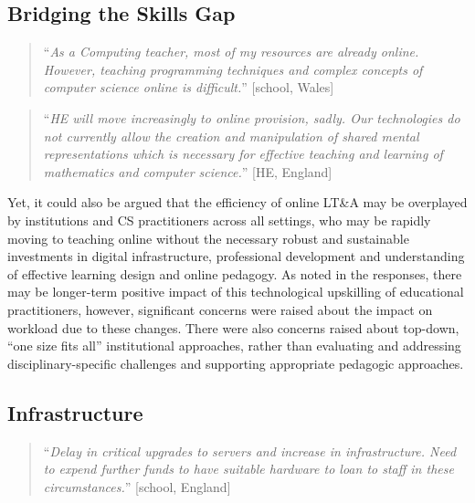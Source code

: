 \documentclass[conference]{IEEEtran}
\begin{document}

\subsection{Bridging the Skills Gap}

\begin{quotation}
``{\emph{As a Computing teacher, most of my resources are already
online. However, teaching programming techniques and complex concepts
of computer science online is difficult.}}'' [school, Wales]
\end{quotation}

\begin{quotation}
``{\emph{HE will move increasingly to online provision, sadly. Our
technologies do not currently allow the creation and manipulation of
shared mental representations which is necessary for effective
teaching and learning of mathematics and computer science.}}'' [HE, England]
\end{quotation}

Yet, it could also be argued that the efficiency of online LT\&A may
be overplayed by institutions and CS practitioners across all
settings, who may be rapidly moving to teaching online without the
necessary robust and sustainable investments in digital
infrastructure, professional development and understanding of
effective learning design and online pedagogy. As noted in the
responses, there may be longer-term positive impact of this
technological upskilling of educational practitioners, however,
significant concerns were raised about the impact on workload due to
these changes. There were also concerns raised about top-down, ``one
size fits all'' institutional approaches, rather than evaluating and
addressing disciplinary-specific challenges and supporting appropriate
pedagogic approaches.

\subsection{Infrastructure}

\begin{quotation}
``{\emph{Delay in critical upgrades to servers and increase in
infrastructure.  Need to expend further funds to have suitable
hardware to loan to staff in these circumstances.}}'' [school, England]
\end{quotation}
\end{document}
